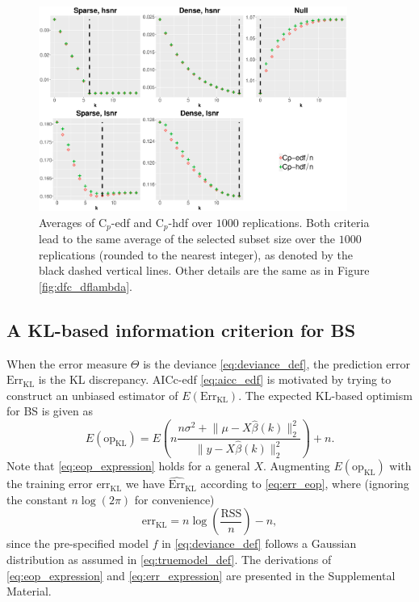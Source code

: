 \begin{figure}[!ht]
	\centering
	\includegraphics[width=0.9\textwidth]{figures/cp_edf_hdf_bs.eps}
	\caption{Averages of C$_p$-edf and C$_p$-hdf over $1000$ replications. Both criteria lead to the same average of the selected subset size over the $1000$ replications (rounded to the nearest integer), as denoted by the black dashed vertical lines. Other details are the same as in Figure \ref{fig:dfc_dflambda}.}
	\label{fig:cp_edf_hdf} 
\end{figure}


\subsection{A KL-based information criterion for BS}
When the error measure $\Theta$ is the deviance \eqref{eq:deviance_def}, the prediction error $\text{Err}_\text{KL}$ is the KL discrepancy. AICc-edf \eqref{eq:aicc_edf} is motivated by trying to construct an unbiased estimator of $E(\text{Err}_\text{KL})$. The expected KL-based optimism for BS is given as
\begin{equation}
E(\text{op}_\text{KL}) = E\left(n \frac{n\sigma^2+\lVert \mu-X\hat{\beta}(k) \rVert_2^2}{\lVert y-X\hat{\beta}(k)\rVert_2^2}\right) + n.
\label{eq:eop_expression}
\end{equation}
Note that \eqref{eq:eop_expression} holds for a general $X$. Augmenting $E(\text{op}_\text{KL})$ with the training error $\text{err}_{\text{KL}}$ we have $\widehat{\text{Err}}_{\text{KL}}$ according to \eqref{eq:err_eop}, where (ignoring the constant $n\log(2\pi)$ for convenience)
\begin{equation}
\text{err}_{\text{KL}} = n\log\left(\frac{\text{RSS}}{n}\right) - n,
\label{eq:err_expression}
\end{equation}
since the pre-specified model $f$ in \eqref{eq:deviance_def} follows a Gaussian distribution as assumed in \eqref{eq:truemodel_def}. The derivations of \eqref{eq:eop_expression} and \eqref{eq:err_expression} are presented in the Supplemental Material. 

